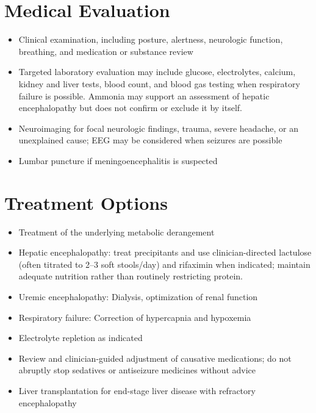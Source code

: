 \section*{Medical Evaluation}
\begin{itemize}
 \item Clinical examination, including posture, alertness, neurologic function, breathing, and medication or substance review
 \item Targeted laboratory evaluation may include glucose, electrolytes, calcium, kidney and liver tests, blood count, and blood gas testing when respiratory failure is possible. Ammonia may support an assessment of hepatic encephalopathy but does not confirm or exclude it by itself.
 \item Neuroimaging for focal neurologic findings, trauma, severe headache, or an unexplained cause; EEG may be considered when seizures are possible
 \item Lumbar puncture if meningoencephalitis is suspected
\end{itemize}

\section*{Treatment Options}
\begin{itemize}
 \item Treatment of the underlying metabolic derangement
 \item Hepatic encephalopathy: treat precipitants and use clinician-directed lactulose (often titrated to 2--3 soft stools/day) and rifaximin when indicated; maintain adequate nutrition rather than routinely restricting protein.
 \item Uremic encephalopathy: Dialysis, optimization of renal function
 \item Respiratory failure: Correction of hypercapnia and hypoxemia
 \item Electrolyte repletion as indicated
 \item Review and clinician-guided adjustment of causative medications; do not abruptly stop sedatives or antiseizure medicines without advice
 \item Liver transplantation for end-stage liver disease with refractory encephalopathy
\end{itemize}

